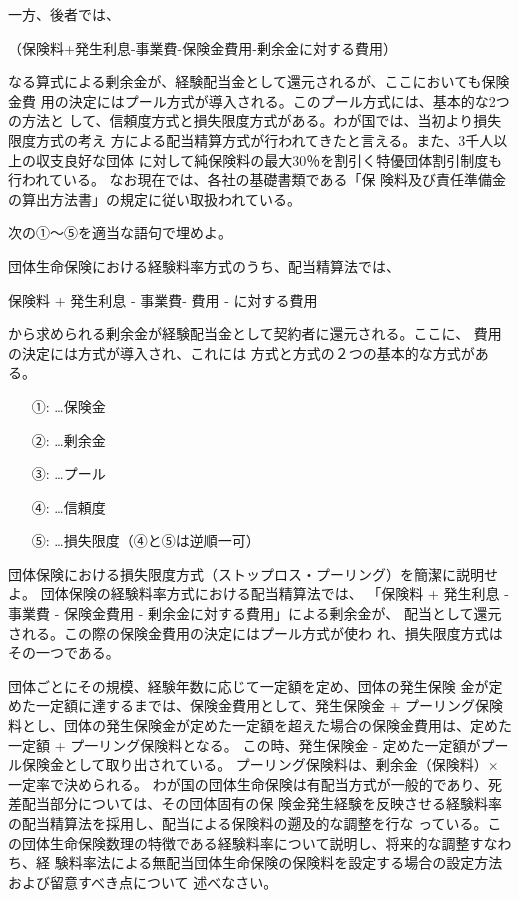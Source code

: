 \documentclass[report,gutter=10mm,fore-edge=10mm,uplatex,dvipdfmx]{jlreq}
\begin{document}
一方、後者では、

（保険料+発生利息-事業費-保険金費用-剰余金に対する費用）

なる算式による剰余金が、経験配当金として還元されるが、ここにおいても保険金費
用の決定にはプール方式が導入される。このプール方式には、基本的な2つの方法と
して、信頼度方式と損失限度方式がある。わが国では、当初より損失限度方式の考え
方による配当精算方式が行われてきたと言える。また、3千人以上の収支良好な団体
に対して純保険料の最大30％を割引く特優団体割引制度も行われている。
なお現在では、各社の基礎書類である「保
険料及び責任準備金の算出方法書」の規定に従い取扱われている。

次の①～⑤を適当な語句で埋めよ。

団体生命保険における経験料率方式のうち、配当精算法では、

保険料 + 発生利息 - 事業費- 費用 - に対する費用

から求められる剰余金が経験配当金として契約者に還元される。ここに、
費用の決定には方式が導入され、これには
方式と方式の２つの基本的な方式がある。
\answer{}
\begin{itemize}
\item[ ①: ] …保険金
\item[ ②: ] …剰余金
\item[ ③: ] …プール
\item[ ④: ] …信頼度
\item[ ⑤: ] …損失限度（④と⑤は逆順一可）
\end{itemize}

団体保険における損失限度方式（ストップロス・プーリング）を簡潔に説明せよ。
\answer{}
団体保険の経験料率方式における配当精算法では、
「保険料 + 発生利息 - 事業費 - 保険金費用 - 剰余金に対する費用」による剰余金が、
配当として還元される。この際の保険金費用の決定にはプール方式が使わ
れ、損失限度方式はその一つである。

団体ごとにその規模、経験年数に応じて一定額を定め、団体の発生保険
金が定めた一定額に達するまでは、保険金費用として、発生保険金 + プーリング保険料とし、団体の発生保険金が定めた一定額を超えた場合の保険金費用は、定めた一定額 + プ一リング保険料となる。
この時、発生保険金 - 定めた一定額がプール保険金として取り出されている。
プーリング保険料は、剰余金（保険料）×一定率で決められる。
わが国の団体生命保険は有配当方式が一般的であり、死差配当部分については、その団体固有の保
険金発生経験を反映させる経験料率の配当精算法を採用し、配当による保険料の遡及的な調整を行な
っている。この団体生命保険数理の特徴である経験料率について説明し、将来的な調整すなわち、経
験料率法による無配当団体生命保険の保険料を設定する場合の設定方法および留意すべき点について
述べなさい。
\answer{}
\end{document}

